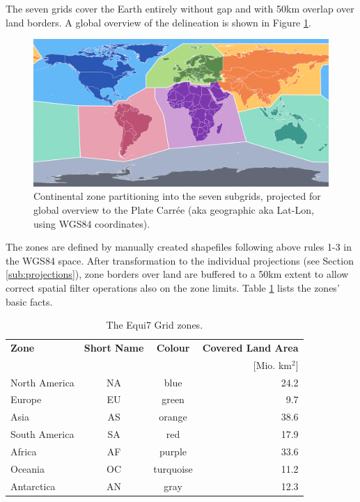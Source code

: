 \documentclass[10pt,a4paper]{article}
\begin{document}
The seven grids cover the Earth entirely without gap and with 50km overlap over land borders. A global overview of the delineation is shown in Figure \ref{fig:gridzones}.

\begin{figure}[hbtp]
\centering
\includegraphics[width=1.0\textwidth]{equi7_grid_v11_overview}
\caption{
Continental zone partitioning into the seven subgrids, projected for global overview to the Plate Carr\'{e}e (aka geographic aka Lat-Lon, using WGS84 coordinates).
}
\label{fig:gridzones}
\end{figure}

The zones are defined by manually created shapefiles following above rules 1-3 in the WGS84 space. After transformation to the individual projections (see Section \ref{sub:projections}), zone borders over land are buffered to a 50km extent to allow correct spatial filter operations also on the zone limits. Table \ref{tab:zones} lists the zones' basic facts. 

\begin{table}[hbtp]
\caption[Zone Facts]{
The Equi7 Grid zones.
}
\centering
	{
	\begin{tabular}{lccr}
	\textbf{Zone} & \textbf{Short Name} & \textbf{Colour} & \textbf{Covered Land Area} \\
	& & & [Mio. km$^{2}$] \\
	\hline
	North America & NA & blue & 24.2 \\
	Europe & EU & green & 9.7 \\
	Asia & AS & orange & 38.6 \\
	South America & SA & red & 17.9 \\
	Africa & AF & purple & 33.6 \\
	Oceania & OC & turquoise & 11.2 \\
	Antarctica & AN & gray & 12.3 \\
	\hline
	\end{tabular} 
	}
\label{tab:zones}
\end{table}
\end{document}
